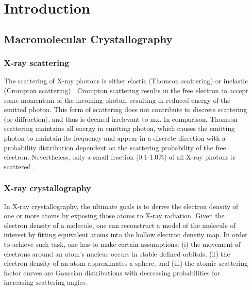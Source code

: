 \section{Introduction}

\subsection{Macromolecular Crystallography}

\subsubsection{X-ray scattering}

The scattering of X-ray photons is either elastic (Thomson scattering) or inelastic (Crompton scattering) \cite{Rupp2010-nc}. Crompton scattering results in the free electron to accept some momentum of the incoming photon, resulting in reduced energy of the emitted photon. This form of scattering does not contribute to discrete scattering (or diffraction), and thus is deemed irrelevant to \gls{mx}. In comparison, Thomson scattering maintains all energy in emitting photon, which causes the emitting photon to maintain its frequency and appear in a discrete direction with a probability distribution dependent on the scattering probability of the free electron. Nevertheless, only a small fraction (0.1-1.0\%) of all X-ray photons is scattered \cite{Rupp2010-nc}.

\subsubsection{X-ray crystallography}

In X-ray crystallography, the ultimate goals is to derive the electron density of one or more atoms by exposing those atoms to X-ray radiation. Given the electron density of a molecule, one can reconstruct a model of the molecule of interest by fitting equivalent atoms into the hollow electron density map. In order to achieve such task, one has to make certain assumptions: (i) the movement of electrons around an atom's nucleus occurs in stable defined orbitals, (ii) the electron density of an atom approximates a sphere, and (iii) the atomic scattering factor curves are Gaussian distributions with decreasing probabilities for increasing scattering angles.

